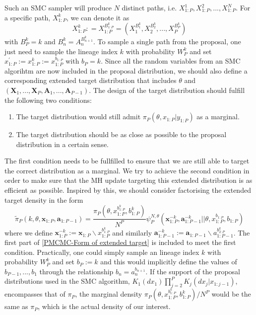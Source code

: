 \documentclass[12pt,a4paper]{article}
\begin{document}
Such an SMC sampler will produce $N$ distinct paths, i.e. $X_{1:P}^1, X_{1:P}^2,...,X_{1:P}^N$. For a specific path, $X_{1:P}^k$, we can denote it as 
$$X_{1:P}^k : = X_{1:P}^{B_{1:P}^k}=\left(X_1^{B_1^k},X_2^{B_2^k},...,X_P^{B_P^k}\right)$$
with $B_P^k = k$ and $B_n^k = A_{n}^{B_{n+1}^k}$. To sample a single path from the proposal, one just need to sample the lineage index $k$ with probability $W_P^k$ and set $x_{1:P}^{'}:= x_{1:P}^{k}:=x_{1:P}^{b_{1:P}}$ with $b_P = k$. Since all the random variables from an SMC algorihtm are now included in the proposal distribution, we should also define a corresponding extended target distribution that includes $\theta$ and $\left(\mathbf{X}_1,...,\mathbf{X}_P,\mathbf{A}_1,...,\mathbf{A}_{P-1}\right)$. The design of the target distribution should fulfill the following two conditions:
\begin{enumerate}[label=\textit{Condition \arabic*.},leftmargin=*]
    \item The target distribution would still admit $\pi_P(\theta,x_{1:P}|y_{1:P})$ as a marginal.
    \item The target distribution should be as close as possible to the proposal distribution in a certain sense.
\end{enumerate}
The first condition needs to be fullfilled to ensure that we are still able to target the correct distribution as a marginal. We try to achieve the second condition in order to make sure that the MH update targeting this extended distribution is as efficient as possible. Inspired by this, we should consider factorising the extended target density in the form
\begin{equation}
    \label{PMCMC-Form of extended target}
    \tilde{\pi}_P(k,\theta,\mathbf{x}_{1:P},\mathbf{a}_{1:P-1}) = \frac{\pi_{P}(\theta,x_{1:P}^{b_{1:P}^k},b_{1:P}^k)}{N^P}\psi_P^{N,\theta}(\mathbf{x}_{1:P}^{-k},\mathbf{a}_{1:P-1}^{-k}||\theta,x_{1:P}^{b_{1:P}},b_{1:P})
\end{equation}  
where we define $\mathbf{x}_{1:P}^{-k} := \mathbf{x}_{1:P}\backslash x_{1:P}^{b_{1:P}^k}$ and similarly $\mathbf{a}_{1:P-1}^{-k} := \mathbf{a}_{1:P-1} \backslash a_{1:P-1}^{b_{2:P}^k}$. The first part of \eqref{PMCMC-Form of extended target} is included to meet the first condition. Practically, one could simply sample an lineage index $k$ with probability $W_P^k$ and set $b_P:=k$ and this would implicitly define the values of $b_{P-1},...,b_1$ through the relationship $b_n = a_n^{b_{n+1}}$. If the support of the proposal distributions used in the SMC algorithm, $K_1(dx_1)\prod_{j=2}^{P}K_j(dx_j|x_{1:j-1})$, encompasses that of $\pi_P$, the marginal density $\pi_P(\theta,x_{1:P}^{b_{1:P}^k},b_{1:P}^k)/N^P$ would be the same as $\pi_P$, which is the actual density of our interest. 
\end{document}
